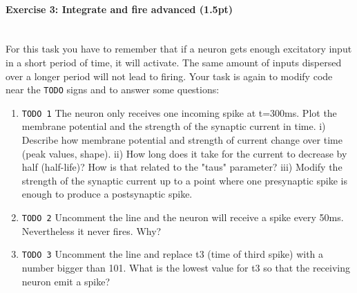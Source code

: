 \documentclass[a4paper,11pt]{article}
\newenvironment{exercise}[3]{\paragraph{Exercise #1: #2 (#3pt)}\ \\}{
\medskip}
\begin{document}
\begin{exercise}{3}{Integrate and fire advanced}{1.5}
For this task you have to remember that if a neuron gets enough excitatory input in a short period of time, it will activate. The same amount of inputs dispersed over a longer period will not lead to firing. Your task is again to modify code near the \texttt{TODO} signs and to answer some questions:
\begin{enumerate}
	\item \texttt{TODO 1} The neuron only receives one incoming spike at t=300ms. Plot the membrane potential and the strength of the synaptic current in time. i) Describe how membrane potential and strength of current change over time (peak values, shape). ii) How long does it take for the current to decrease by half (half-life)? How is that related to the "taus" parameter? iii) Modify the strength of the synaptic current up to a point where one presynaptic spike is enough to produce a postsynaptic spike.
	\item \texttt{TODO 2} Uncomment the line and the neuron will receive a spike every 50ms. Nevertheless it never fires. Why?
	\item \texttt{TODO 3} Uncomment the line and replace t3 (time of third spike) with a number bigger than 101. What is the lowest value for t3 so that the receiving neuron emit a spike?
\end{enumerate}
\end{exercise}
\end{document}
